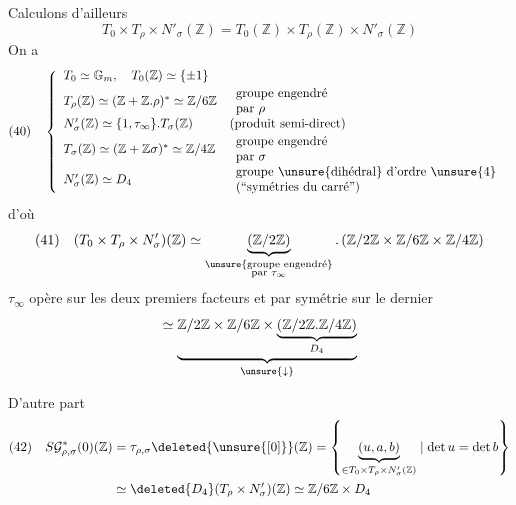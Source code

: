 Calculons d'ailleurs
\[
T_0\times T_\rho\times N'_\sigma(\mathbb Z)
=T_0(\mathbb Z)\times T_\rho(\mathbb Z)\times N'_\sigma(\mathbb Z)
\]
On a
\[
(40)\quad
\left\{
\begin{array}{ll}
T_0\simeq\mathbb G_m,\quad T_0(\mathbb Z)\simeq\{\pm1\}&\\[2pt]
T_\rho(\mathbb Z)\simeq(\mathbb Z+\mathbb Z.\rho)^*\simeq\mathbb Z/6\mathbb Z
&\begin{array}{l}\text{groupe engendré}\\\text{par }\rho\end{array}\\[2pt]
N'_\sigma(\mathbb Z)\simeq\{1,\tau_\infty\}.T_\sigma(\mathbb Z)
&\text{(produit semi-direct)}\\[2pt]
T_\sigma(\mathbb Z)\simeq(\mathbb Z+\mathbb Z\sigma)^*\simeq\mathbb Z/4\mathbb Z
&\begin{array}{l}\text{groupe engendré}\\\text{par }\sigma\end{array}\\[2pt]
N'_\sigma(\mathbb Z)\simeq D_4
&\begin{array}{l}\text{groupe \unsure{dihédral} d'ordre \unsure{4}}\\\text{(``symétries du carré'')}\end{array}
\end{array}
\right.
\]
d'où
\[
(41)\quad (T_0\times T_\rho\times N'_\sigma)(\mathbb Z)
\simeq
\underbrace{(\mathbb Z/2\mathbb Z)}_{\substack{\text{\unsure{groupe engendré}}\\\text{par }\tau_\infty}}
.\,(\mathbb Z/2\mathbb Z\times\mathbb Z/6\mathbb Z\times\mathbb Z/4\mathbb Z)
\]
\hfill $\tau_\infty$ opère  sur les deux premiers facteurs et par symétrie sur le dernier
\[
\simeq\underbrace{\mathbb Z/2\mathbb Z\times\mathbb Z/6\mathbb Z\times
\underbrace{(\mathbb Z/2\mathbb Z.\mathbb Z/4\mathbb Z)}_{D_4}}_{\unsure{\downarrow}}
\]

D'autre part
\[
\begin{aligned}
(42)\quad S\mathcal G^*_{\rho,\sigma}(0)(\mathbb Z)
&=\tau_{\rho,\sigma}\deleted{\unsure{[0]}}(\mathbb Z)
=\left\{\underbrace{(u,a,b)}_{\in T_0\times T_\rho\times N'_\sigma(\mathbb Z)}\mid\det u=\det b\right\}\\
&\simeq\deleted{D_4}(T_\rho\times N'_\sigma)(\mathbb Z)\simeq\mathbb Z/6\mathbb Z\times D_4
\end{aligned}
\]
\deleted{$\tau_\infty,$}

